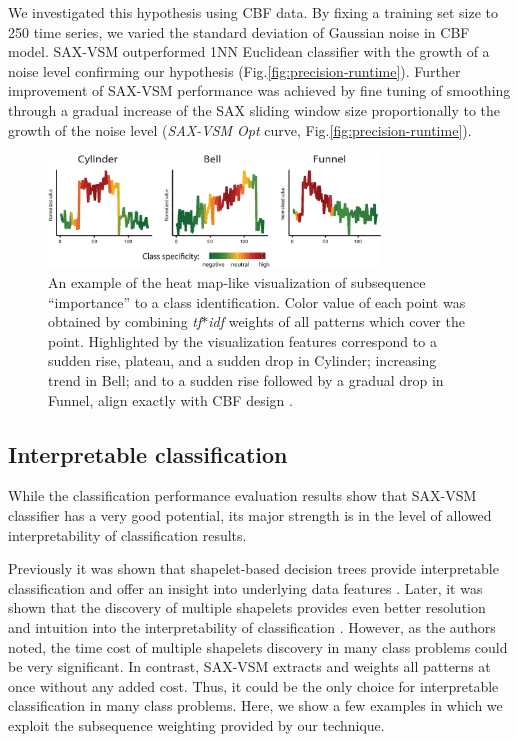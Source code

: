 \documentclass[conference]{IEEEtran}
\begin{document}
We investigated this hypothesis using CBF data. By fixing a training set size to 250 
time series, we varied the standard deviation of Gaussian noise in CBF model.
SAX-VSM outperformed 1NN Euclidean classifier with the growth of a noise level 
confirming our hypothesis (Fig.\ref{fig:precision-runtime}). 
Further improvement of SAX-VSM performance was achieved by fine tuning of smoothing 
through a gradual increase of the SAX sliding window size proportionally to the growth of 
the noise level (\textit{SAX-VSM Opt} curve, Fig.\ref{fig:precision-runtime}). 

\begin{figure}[b]
   \centering
   \vspace{0.3cm}
   \includegraphics[width=88mm]{figures/CBF-HEAT.eps}
   \caption{An example of the heat map-like visualization of subsequence ``importance''
   to a class identification. Color value of each point was obtained by combining 
   \textit{tf$\ast$idf} weights of all patterns which cover the point.
   Highlighted by the visualization features correspond to a sudden rise, plateau, 
   and a sudden drop in Cylinder; increasing trend in Bell; and to a sudden rise 
   followed by a gradual drop in Funnel, align exactly with CBF design \cite{cbf}.}
   \label{fig:heat}
   \vspace{-0.5cm}
\end{figure}

\subsection{Interpretable classification}
While the classification performance evaluation results show that SAX-VSM classifier has 
a very good potential, its major strength is in the level of allowed interpretability of 
classification results. 

Previously it was shown that shapelet-based decision trees provide interpretable 
classification and offer an insight into underlying data features \cite{shapelet}. 
Later, it was shown that the discovery of multiple shapelets provides even 
better resolution and intuition into the interpretability of classification \cite{bagnal}. 
However, as the authors noted, the time cost of multiple shapelets discovery
in many class problems could be very significant. 
In contrast, SAX-VSM extracts and weights all patterns at once without
any added cost. Thus, it could be the only choice for interpretable classification 
in many class problems. 
Here, we show a few examples in which we exploit the subsequence weighting 
provided by our technique.
\end{document}
